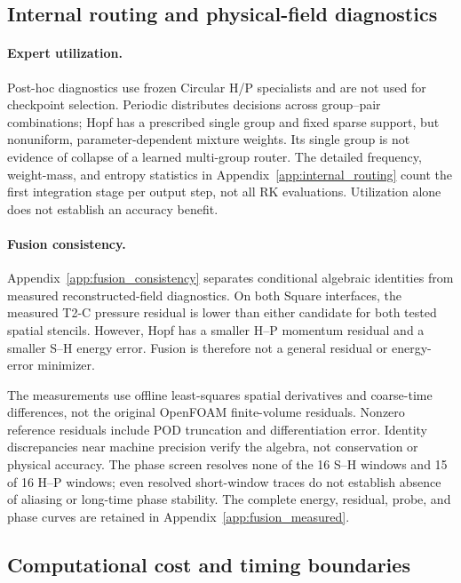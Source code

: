 \subsection{Internal routing and physical-field diagnostics}
\label{sec:exp_diagnostics}

\paragraph{Expert utilization.}
Post-hoc diagnostics use frozen Circular H/P specialists and are
not used for checkpoint selection.
Periodic distributes decisions across group--pair combinations;
Hopf has a prescribed single group and fixed sparse support, but
nonuniform, parameter-dependent mixture weights.
Its single group is not evidence of collapse of a learned
multi-group router. The detailed frequency, weight-mass, and entropy
statistics in Appendix~\ref{app:internal_routing} count the first
integration stage per output step, not all RK evaluations.
Utilization alone does not establish an accuracy benefit.

\paragraph{Fusion consistency.}
Appendix~\ref{app:fusion_consistency} separates conditional algebraic
identities from measured reconstructed-field diagnostics.
On both Square interfaces, the measured T2-C pressure residual is
lower than either candidate for both tested spatial stencils.
However, Hopf has a smaller H--P momentum residual and a smaller
S--H energy error. Fusion is therefore not a general residual or
energy-error minimizer.

The measurements use offline least-squares spatial derivatives
and coarse-time differences, not the original OpenFOAM
finite-volume residuals. Nonzero reference residuals include POD
truncation and differentiation error.
Identity discrepancies near machine precision verify the algebra,
not conservation or physical accuracy.
The phase screen resolves none of the 16 S--H windows and 15 of
16 H--P windows; even resolved short-window traces do not establish
absence of aliasing or long-time phase stability.
The complete energy, residual, probe, and phase curves are retained
in Appendix~\ref{app:fusion_measured}.

\subsection{Computational cost and timing boundaries}
\label{sec:exp_cost}

